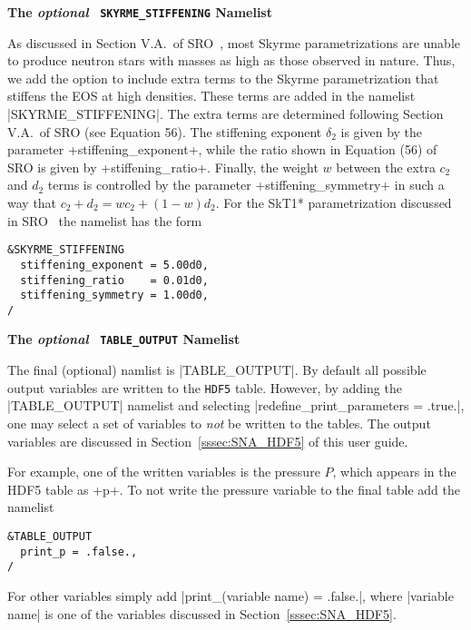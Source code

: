 \documentclass[letterpaper,11pt]{refart}
\begin{document}
\newpage
\bigskip
\textbf{The \emph{optional} \texttt{\color{cyan} SKYRME\_STIFFENING}
  Namelist}

As discussed in Section V.A.\ of SRO~\cite{schneider:17}, most Skyrme
parametrizations are unable to produce neutron stars with masses as
high as those observed in nature.  Thus, we add the option to include
extra terms to the Skyrme parametrization that stiffens the EOS at
high densities. These terms are added in the namelist
\verbnml|SKYRME_STIFFENING|.  The extra terms are determined following
Section V.A.\ of SRO \cite{schneider:17} (see Equation 56).  The
stiffening exponent $\delta_2$ is given by the parameter
\verbprm+stiffening_exponent+, while the ratio shown in Equation (56)
of SRO \cite{schneider:17} is given by
\verbprm+stiffening_ratio+. Finally, the weight $w$ between the extra $c_2$ and $d_2$ terms is controlled by the parameter
\verbprm+stiffening_symmetry+ in such a way that $c_2+d_2=wc_2+(1-w)d_2$.  For the SkT1* parametrization
discussed in SRO~\cite{schneider:17} the namelist has the form {\color{cyan}
\begin{verbatim}
&SKYRME_STIFFENING
  stiffening_exponent = 5.00d0,
  stiffening_ratio    = 0.01d0,
  stiffening_symmetry = 1.00d0,
/
\end{verbatim}}



\vspace*{1cm}

\textbf{The \emph{optional} \texttt{\color{cyan} TABLE\_OUTPUT}
  Namelist}


The final (optional) namlist is \verbnml|TABLE_OUTPUT|.  
By default all possible output variables are written
to the \verb|HDF5| table.  However, by adding the \verbnml|TABLE_OUTPUT| 
namelist and selecting \verbprm|redefine_print_parameters = .true.|,
one may select a set of variables to \emph{not} be written to the
tables.  The output variables are discussed in
Section~\ref{sssec:SNA_HDF5} of this user guide.

For example, one of the written variables is the pressure $P$, which
appears in the HDF5 table as \verbprm+p+.  To not write the pressure
variable to the final table add the namelist {\color{cyan}
\begin{verbatim}
&TABLE_OUTPUT
  print_p = .false.,
/
\end{verbatim}}
For other variables simply add \verbprm|print_(variable name) = .false.|, where
\verbprm|variable name| is one of the variables discussed in 
Section~\ref{sssec:SNA_HDF5}.
\end{document}
